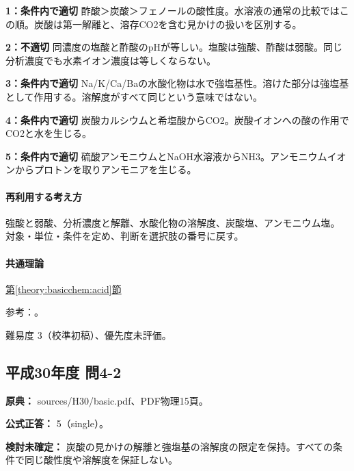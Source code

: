 \noindent\textbf{1：条件内で適切} 酢酸＞炭酸＞フェノールの酸性度。水溶液の通常の比較ではこの順。炭酸は第一解離と、溶存CO2を含む見かけの扱いを区別する。\par

\noindent\textbf{2：不適切} 同濃度の塩酸と酢酸のpHが等しい。塩酸は強酸、酢酸は弱酸。同じ分析濃度でも水素イオン濃度は等しくならない。\par

\noindent\textbf{3：条件内で適切} Na/K/Ca/Baの水酸化物は水で強塩基性。溶けた部分は強塩基として作用する。溶解度がすべて同じという意味ではない。\par

\noindent\textbf{4：条件内で適切} 炭酸カルシウムと希塩酸からCO2。炭酸イオンへの酸の作用でCO2と水を生じる。\par

\noindent\textbf{5：条件内で適切} 硫酸アンモニウムとNaOH水溶液からNH3。アンモニウムイオンからプロトンを取りアンモニアを生じる。\par

\paragraph{再利用する考え方} 強酸と弱酸、分析濃度と解離、水酸化物の溶解度、炭酸塩、アンモニウム塩。 対象・単位・条件を定め、判断を選択肢の番号に戻す。

\paragraph{共通理論} \hyperref[theory:basicchem:acid]{第\ref*{theory:basicchem:acid}節}

\par 参考：\cite{purdue_acid_strength,chem55_hydrolysis}。

\par 難易度 3（校準初稿）、優先度未評価。

\subsection{平成30年度 問4-2}
\label{q:h30-reg-basic-4-2}

\noindent\textbf{原典：} sources/H30/basic.pdf、PDF物理15頁。

\textbf{公式正答：} 5（single）。

\par\textbf{検討未確定：} 炭酸の見かけの解離と強塩基の溶解度の限定を保持。すべての条件で同じ酸性度や溶解度を保証しない。

